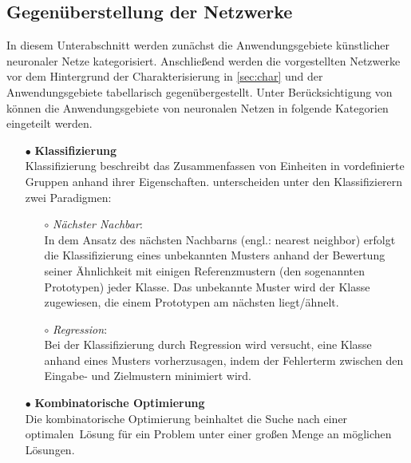 \subsection{Gegenüberstellung der Netzwerke}
In diesem Unterabschnitt werden zunächst die Anwendungsgebiete künstlicher neuronaler Netze kategorisiert. Anschließend werden die vorgestellten Netzwerke vor dem Hintergrund der Charakterisierung in \autoref{sec:char} und der Anwendungsgebiete tabellarisch gegenübergestellt. Unter Berücksichtigung von \citet{Fiesler96} können die Anwendungsgebiete von neuronalen Netzen in folgende Kategorien eingeteilt werden.
\begin{itemize}
\item[\textbf{$\bullet$}] \textbf{Klassifizierung}\\%
Klassifizierung beschreibt das Zusammenfassen von Einheiten in vordefinierte Gruppen anhand ihrer Eigenschaften.
\citet{Fiesler96} unterscheiden unter den Klassifizierern zwei Paradigmen:
    \begin{itemize}
    \item[\textbf{$\circ$}] \textit{Nächster Nachbar}:\\%
    In dem Ansatz des nächsten Nachbarns (engl.: nearest neighbor) erfolgt die Klassifizierung eines unbekannten Musters anhand der Bewertung seiner Ähnlichkeit mit einigen Referenzmustern (den sogenannten Prototypen) jeder Klasse. Das unbekannte Muster wird der Klasse zugewiesen, die einem Prototypen am nächsten liegt/ähnelt.
    
    \item[\textbf{$\circ$}] \textit{Regression}:\\%
    Bei der Klassifizierung durch Regression wird versucht, eine Klasse anhand eines Musters vorherzusagen, indem der Fehlerterm zwischen den Eingabe- und Zielmustern minimiert wird.
    \end{itemize}


\item[\textbf{$\bullet$}] \textbf{Kombinatorische Optimierung}\\%
Die kombinatorische Optimierung beinhaltet die Suche nach einer \glqq optimalen\grqq~Lösung für ein Problem unter einer großen Menge an möglichen Lösungen. 
 


\end{itemize}
